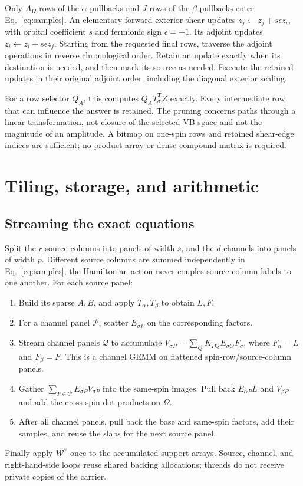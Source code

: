 \documentclass[11pt,a4paper]{article}
\newcommand{\Tr}{^{\mathsf T}}
\newcommand{\Wa}{\mathcal W}
\begin{document}
Only $A_\Omega$ rows of the $\alpha$ pullbacks and $J$ rows of the
$\beta$ pullbacks enter Eq.~\eqref{eq:samples}. An elementary forward
exterior shear updates $z_j\leftarrow z_j+s\epsilon z_i$, with orbital
coefficient $s$ and fermionic sign $\epsilon=\pm1$. Its adjoint updates
$z_i\leftarrow z_i+s\epsilon z_j$. Starting from the requested final
rows, traverse the adjoint operations in reverse chronological order.
Retain an update exactly when its destination is needed, and then mark
its source as needed. Execute the retained updates in their original
adjoint order, including the diagonal exterior scaling.

For a row selector $Q_A$, this computes $Q_A T_\sigma\Tr Z$ exactly.
Every intermediate row that can influence the answer is retained. The
pruning concerns paths through a linear transformation, not closure of
the selected VB space and not the magnitude of an amplitude. A bitmap on
one-spin rows and retained shear-edge indices are sufficient; no product
array or dense compound matrix is required.

\section{Tiling, storage, and arithmetic}

\subsection{Streaming the exact equations}

Split the $r$ source columns into panels of width $s$, and the $d$ channels
into panels of width $p$. Different source columns are summed independently
in Eq.~\eqref{eq:samples}; the Hamiltonian action never couples source
column labels to one another. For each source panel:
\begin{enumerate}[label=\arabic*.]
 \item Build its sparse $A,B$, and apply $T_\alpha,T_\beta$ to obtain $L,F$.
 \item For a channel panel $\mathcal P$, scatter $E_{\sigma P}$ on the
       corresponding factors.
 \item Stream channel panels $\mathcal Q$ to accumulate
       $V_{\sigma P}=\sum_QK_{PQ}E_{\sigma Q}F_\sigma$,
       where $F_\alpha=L$ and $F_\beta=F$. This is a channel GEMM on
       flattened spin-row/source-column panels.
 \item Gather $\sum_{P\in\mathcal P}E_{\sigma P}V_{\sigma P}$ into
       the same-spin images. Pull back $E_{\alpha P}L$ and $V_{\beta P}$
       and add the cross-spin dot products on $\Omega$.
 \item After all channel panels, pull back the base and same-spin factors,
       add their samples, and reuse the slabs for the next source panel.
\end{enumerate}
Finally apply $\Wa^*$ once to the accumulated support arrays. Source,
channel, and right-hand-side loops reuse shared backing allocations;
threads do not receive private copies of the carrier.
\end{document}
